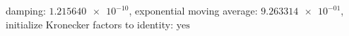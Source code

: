 damping: $\num[scientific-notation=true]{1.215640e-10}$, exponential moving average: $\num[scientific-notation=true]{9.263314e-01}$, initialize Kronecker factors to identity: $\text{yes}$